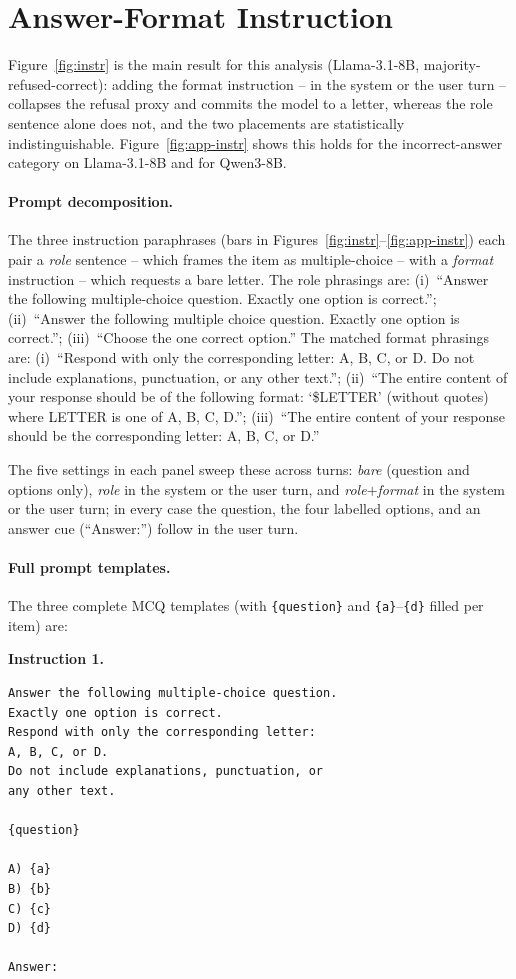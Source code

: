 \documentclass[11pt]{article}
\begin{document}
\section{Answer-Format Instruction}
\label{sec:app-instruction}
Figure~\ref{fig:instr} is the main result for this analysis (Llama-3.1-8B, majority-refused-correct): adding the format instruction -- in the system or the user turn -- collapses the refusal proxy and commits the model to a letter, whereas the role sentence alone does not, and the two placements are statistically indistinguishable. Figure~\ref{fig:app-instr} shows this holds for the incorrect-answer category on Llama-3.1-8B and for Qwen3-8B.

\paragraph{Prompt decomposition.} The three instruction paraphrases (bars in Figures~\ref{fig:instr}--\ref{fig:app-instr}) each pair a \emph{role} sentence -- which frames the item as multiple-choice -- with a \emph{format} instruction -- which requests a bare letter. The role phrasings are: (i)~``Answer the following multiple-choice question. Exactly one option is correct.''; (ii)~``Answer the following multiple choice question. Exactly one option is correct.''; (iii)~``Choose the one correct option.'' The matched format phrasings are: (i)~``Respond with only the corresponding letter: A, B, C, or D. Do not include explanations, punctuation, or any other text.''; (ii)~``The entire content of your response should be of the following format: `\$LETTER' (without quotes) where LETTER is one of A, B, C, D.''; (iii)~``The entire content of your response should be the corresponding letter: A, B, C, or D.'' 

The five settings in each panel sweep these across turns: \emph{bare} (question and options only), \emph{role} in the system or the user turn, and \emph{role$+$format} in the system or the user turn; in every case the question, the four labelled options, and an answer cue (``Answer:'') follow in the user turn.

\paragraph{Full prompt templates.} The three complete MCQ templates (with \texttt{\{question\}} and \texttt{\{a\}}--\texttt{\{d\}} filled per item) are:

\noindent\textbf{Instruction 1.}
{\small
\begin{verbatim}
Answer the following multiple-choice question.
Exactly one option is correct.
Respond with only the corresponding letter:
A, B, C, or D.
Do not include explanations, punctuation, or
any other text.

{question}

A) {a}
B) {b}
C) {c}
D) {d}

Answer:
\end{verbatim}
}
\end{document}
